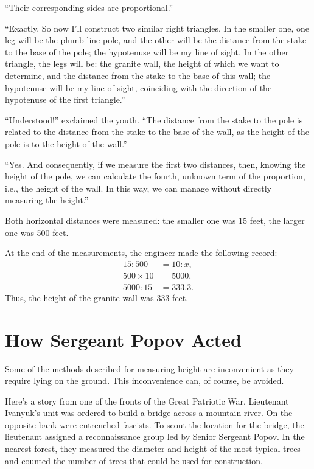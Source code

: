 ``Their corresponding sides are proportional.''

``Exactly. So now I'll construct two similar right triangles. In the smaller one, one leg will be the plumb-line pole, and the other will be the distance from the stake to the base of the pole; the hypotenuse will be my line of sight. In the other triangle, the legs will be: the granite wall, the height of which we want to determine, and the distance from the stake to the base of this wall; the hypotenuse will be my line of sight, coinciding with the direction of the hypotenuse of the first triangle.''

``Understood!'' exclaimed the youth. ``The distance from the stake to the pole is related to the distance from the stake to the base of the wall, as the height of the pole is to the height of the wall.''

``Yes. And consequently, if we measure the first two distances, then, knowing the height of the pole, we can calculate the fourth, unknown term of the proportion, i.e., the height of the wall. In this way, we can manage without directly measuring the height.''

Both horizontal distances were measured: the smaller one was 15 feet, the larger one was 500 feet.

At the end of the measurements, the engineer made the following record:
\begin{align*}%
15 : 500 & = 10 : x,\\
500 \times 10 & = 5000,\\
5000 : 15 & = 333.3.
\end{align*}
Thus, the height of the granite wall was 333 feet.


\section{How Sergeant Popov Acted}
\label{sec-1.4}

Some of the methods described for measuring height are inconvenient as they require lying on the ground. This inconvenience can, of course, be avoided.

Here's a story from one of the fronts of the Great Patriotic War. Lieutenant Ivanyuk's unit was ordered to build a bridge across a mountain river. On the opposite bank were entrenched fascists. To scout the location for the bridge, the lieutenant assigned a reconnaissance group led by Senior Sergeant Popov. In the nearest forest, they measured the diameter and height of the most typical trees and counted the number of trees that could be used for construction.

